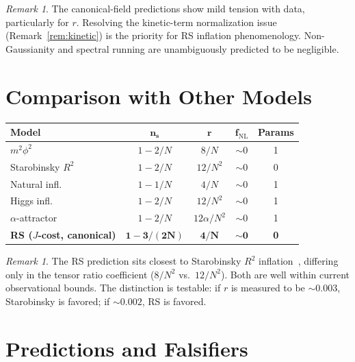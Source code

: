 \documentclass[12pt,a4paper]{article}
\theoremstyle{definition}
\theoremstyle{remark}
\newtheorem{remark}[theorem]{Remark}
\begin{document}
\begin{remark}
The canonical-field predictions show mild tension with data,
particularly for $r$.  Resolving the kinetic-term normalization
issue (Remark~\ref{rem:kinetic}) is the priority for RS
inflation phenomenology.  Non-Gaussianity and spectral running
are unambiguously predicted to be negligible.
\end{remark}

\section{Comparison with Other Models}
\label{sec:models}

\begin{center}
\renewcommand{\arraystretch}{1.3}
\begin{tabular}{@{}lcccc@{}}
\toprule
\textbf{Model} & $\boldsymbol{n_s}$ &
$\boldsymbol{r}$ &
$\boldsymbol{f_{\mathrm{NL}}}$ &
\textbf{Params} \\
\midrule
$m^2\phi^2$ & $1 - 2/N$ & $8/N$ & $\sim 0$ & 1 \\
Starobinsky $R^2$ & $1 - 2/N$ & $12/N^2$ & $\sim 0$ & 0 \\
Natural infl.\ & $1 - 1/N$ & $4/N$ & $\sim 0$ & 1 \\
Higgs infl.\ & $1 - 2/N$ & $12/N^2$ & $\sim 0$ & 1 \\
$\alpha$-attractor & $1 - 2/N$ & $12\alpha/N^2$
& $\sim 0$ & 1 \\
\textbf{RS ($J$-cost, canonical)} & $\boldsymbol{1 - 3/(2N)}$
& $\boldsymbol{4/N}$ & $\boldsymbol{\sim 0}$
& \textbf{0} \\
\bottomrule
\end{tabular}
\end{center}

\begin{remark}
The RS prediction sits closest to Starobinsky $R^2$
inflation~\cite{Starobinsky1980}, differing only in the
tensor ratio coefficient ($8/N^2$ vs.\ $12/N^2$).  Both
are well within current observational bounds.  The
distinction is testable: if $r$ is measured to be
$\sim 0.003$, Starobinsky is favored; if
$\sim 0.002$, RS is favored.
\end{remark}

\section{Predictions and Falsifiers}
\label{sec:predictions}
\end{document}
